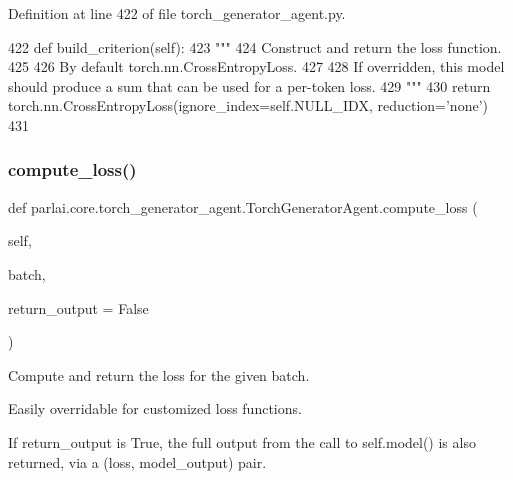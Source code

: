 Definition at line 422 of file torch\+\_\+generator\+\_\+agent.\+py.


\begin{DoxyCode}
422     \textcolor{keyword}{def }build\_criterion(self):
423         \textcolor{stringliteral}{"""}
424 \textcolor{stringliteral}{        Construct and return the loss function.}
425 \textcolor{stringliteral}{}
426 \textcolor{stringliteral}{        By default torch.nn.CrossEntropyLoss.}
427 \textcolor{stringliteral}{}
428 \textcolor{stringliteral}{        If overridden, this model should produce a sum that can be used for a per-token loss.}
429 \textcolor{stringliteral}{        """}
430         \textcolor{keywordflow}{return} torch.nn.CrossEntropyLoss(ignore\_index=self.NULL\_IDX, reduction=\textcolor{stringliteral}{'none'})
431 
\end{DoxyCode}
\mbox{\label{classparlai_1_1core_1_1torch__generator__agent_1_1TorchGeneratorAgent_a94808a13bba0d5283613acd98516bd3c}} 
\subsubsection{\texorpdfstring{compute\+\_\+loss()}{compute\_loss()}}
{\footnotesize\ttfamily def parlai.\+core.\+torch\+\_\+generator\+\_\+agent.\+Torch\+Generator\+Agent.\+compute\+\_\+loss (\begin{DoxyParamCaption}\item[{}]{self,  }\item[{}]{batch,  }\item[{}]{return\+\_\+output = {\ttfamily False} }\end{DoxyParamCaption})}

\begin{DoxyVerb}Compute and return the loss for the given batch.

Easily overridable for customized loss functions.

If return_output is True, the full output from the call to self.model()
is also returned, via a (loss, model_output) pair.
\end{DoxyVerb}
 

